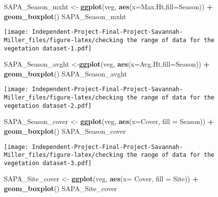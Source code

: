 \documentclass[
]{article}
\newenvironment{Shaded}{\begin{snugshade}}{\end{snugshade}}
\newcommand{\AttributeTok}[1]{\textcolor[rgb]{0.13,0.29,0.53}{#1}}
\newcommand{\FunctionTok}[1]{\textcolor[rgb]{0.13,0.29,0.53}{\textbf{#1}}}
\newcommand{\NormalTok}[1]{#1}
\newcommand{\OtherTok}[1]{\textcolor[rgb]{0.56,0.35,0.01}{#1}}
\newcommand{\SpecialCharTok}[1]{\textcolor[rgb]{0.81,0.36,0.00}{\textbf{#1}}}
\begin{document}
\begin{Shaded}
\begin{Highlighting}[]
\NormalTok{SAPA\_Season\_mxht }\OtherTok{\textless{}{-}} \FunctionTok{ggplot}\NormalTok{(veg, }\FunctionTok{aes}\NormalTok{(}\AttributeTok{x=}\NormalTok{Max.Ht,}\AttributeTok{fill=}\NormalTok{Season)) }\SpecialCharTok{+} \FunctionTok{geom\_boxplot}\NormalTok{()}
\NormalTok{SAPA\_Season\_mxht}
\end{Highlighting}
\end{Shaded}

\texttt{[image: Independent-Project-Final-Project-Savannah-Miller\_files/figure-latex/checking the range of data for the vegetation dataset-1.pdf]}

\begin{Shaded}
\begin{Highlighting}[]
\NormalTok{SAPA\_Season\_avght }\OtherTok{\textless{}{-}}\FunctionTok{ggplot}\NormalTok{(veg, }\FunctionTok{aes}\NormalTok{(}\AttributeTok{x=}\NormalTok{Avg.Ht,}\AttributeTok{fill=}\NormalTok{Season)) }\SpecialCharTok{+} \FunctionTok{geom\_boxplot}\NormalTok{()}
\NormalTok{SAPA\_Season\_avght}
\end{Highlighting}
\end{Shaded}

\texttt{[image: Independent-Project-Final-Project-Savannah-Miller\_files/figure-latex/checking the range of data for the vegetation dataset-2.pdf]}

\begin{Shaded}
\begin{Highlighting}[]
\NormalTok{SAPA\_Season\_cover }\OtherTok{\textless{}{-}} \FunctionTok{ggplot}\NormalTok{(veg, }\FunctionTok{aes}\NormalTok{(}\AttributeTok{x=}\NormalTok{Cover, }\AttributeTok{fill =}\NormalTok{ Season)) }\SpecialCharTok{+} \FunctionTok{geom\_boxplot}\NormalTok{()}
\NormalTok{SAPA\_Season\_cover}
\end{Highlighting}
\end{Shaded}

\texttt{[image: Independent-Project-Final-Project-Savannah-Miller\_files/figure-latex/checking the range of data for the vegetation dataset-3.pdf]}

\begin{Shaded}
\begin{Highlighting}[]
\NormalTok{SAPA\_Site\_cover }\OtherTok{\textless{}{-}} \FunctionTok{ggplot}\NormalTok{(veg, }\FunctionTok{aes}\NormalTok{(}\AttributeTok{x=}\NormalTok{ Cover, }\AttributeTok{fill =}\NormalTok{ Site)) }\SpecialCharTok{+} \FunctionTok{geom\_boxplot}\NormalTok{()}
\NormalTok{SAPA\_Site\_cover}
\end{Highlighting}
\end{Shaded}
\end{document}
